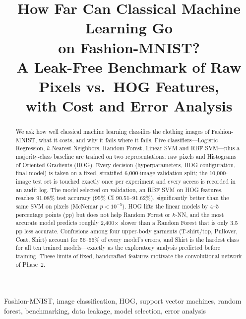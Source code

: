 \documentclass[conference]{IEEEtran}
\newcommand{\pp}{\,pp}                       %
\begin{document}
\title{How Far Can Classical Machine Learning Go\\on Fashion-MNIST?\\[2pt]
\large A Leak-Free Benchmark of Raw Pixels vs.\ HOG Features,\\with Cost and Error Analysis}

\author{
}

\maketitle

\begin{abstract}
We ask how well classical machine learning classifies the clothing images of Fashion-MNIST, what it costs, and why it fails
where it fails. Five classifiers---Logistic Regression, $k$-Nearest Neighbors, Random Forest, Linear SVM and RBF
SVM---plus a majority-class baseline are trained on two representations: raw pixels and Histograms of Oriented Gradients
(HOG). Every decision (hyperparameters, HOG configuration, final model) is taken on a fixed, stratified 6{,}000-image
validation split; the 10{,}000-image test set is touched exactly once per experiment and every access is recorded in an
audit log. The model selected on validation, an RBF SVM on HOG features, reaches 91.08\% test accuracy
(95\% CI 90.51--91.62\%), significantly better than the same SVM on pixels (McNemar $p<10^{-5}$). HOG lifts the linear
models by 4--5 percentage points (pp) but does not help Random Forest or $k$-NN, and the most accurate model predicts roughly
2{,}400$\times$ slower than a Random Forest that is only 3.5\pp{} less accurate. Confusions among four upper-body
garments (T-shirt/top, Pullover, Coat, Shirt) account for 56--66\% of every model's errors, and Shirt is the hardest class
for all ten trained models---exactly as the exploratory analysis predicted before training. These limits of fixed,
handcrafted features motivate the convolutional network of Phase~2.
\end{abstract}

\begin{IEEEkeywords}
Fashion-MNIST, image classification, HOG, support vector machines, random forest, benchmarking, data leakage,
model selection, error analysis
\end{IEEEkeywords}
\end{document}
